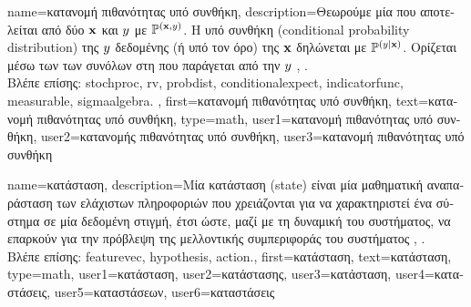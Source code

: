 {name={\foreignlanguage{greek}{κατανομή πιθανότητας υπό συνθήκη}}, 
	description={\foreignlanguage{greek}{Θεωρούμε μία} 
		 \foreignlanguage{greek}{που αποτελείται από δύο}  ${\bf x}$ 
		\foreignlanguage{greek}{και $y$ με}  $\mathbb{P}^{({\bf x},y)}$. 
		\foreignlanguage{greek}{Η}  \foreignlanguage{greek}{υπό συνθήκη} (conditional probability distribution) 
		\foreignlanguage{greek}{της $y$ δεδομένης (ή υπό τον όρο) της ${\bf x}$ δηλώνεται με $\mathbb{P}^{(y|{\bf x})}$. 
		Ορίζεται μέσω των}  \foreignlanguage{greek}{των}  
    		 \foreignlanguage{greek}{συνόλων στη}  
		\foreignlanguage{greek}{που παράγεται από την}  $y$ 
		\cite[\foreignlanguage{greek}{Ενότητα} 34]{BillingsleyProbMeasure}, \cite{KallenbergBook}. 
		\\
		\foreignlanguage{greek}{Βλέπε επίσης:} \gls{stochproc}, \gls{rv}, \gls{probdist}, \gls{conditionalexpect}, 
		\gls{indicatorfunc}, \gls{measurable}, \gls{sigmaalgebra}. },
  	first={\foreignlanguage{greek}{κατανομή πιθανότητας υπό συνθήκη}}, 
  	text={\foreignlanguage{greek}{κατανομή πιθανότητας υπό συνθήκη}},
	type=math,
	user1={\foreignlanguage{greek}{κατανομή πιθανότητας υπό συνθήκη}}, %
  	user2={\foreignlanguage{greek}{κατανομής πιθανότητας υπό συνθήκη}}, %
	user3={\foreignlanguage{greek}{κατανομή πιθανότητας υπό συνθήκη}} %
}

{name={\foreignlanguage{greek}{κατάσταση}},
	description={\foreignlanguage{greek}{Μία κατάσταση} (state) 
		\foreignlanguage{greek}{είναι μία μαθηματική αναπαράσταση των ελάχιστων πληροφοριών  
		που χρειάζονται για να χαρακτηριστεί ένα σύστημα σε μία δεδομένη στιγμή, έτσι ώστε, 
		μαζί με τη δυναμική του συστήματος, να επαρκούν για την πρόβλεψη 
		της μελλοντικής συμπεριφοράς του συστήματος} \cite{SuttonEd2}, \cite{BertsekasDynOptII}. 	
		\\
		\foreignlanguage{greek}{Βλέπε επίσης:} \gls{featurevec}, \gls{hypothesis}, \gls{action}.},
	first={\foreignlanguage{greek}{κατάσταση}},
	text={\foreignlanguage{greek}{κατάσταση}},
	type=math,
	user1={\foreignlanguage{greek}{κατάσταση}}, %
  	user2={\foreignlanguage{greek}{κατάστασης}}, %
	user3={\foreignlanguage{greek}{κατάσταση}}, %
	user4={\foreignlanguage{greek}{καταστάσεις}}, %
  	user5={\foreignlanguage{greek}{καταστάσεων}}, %
	user6={\foreignlanguage{greek}{καταστάσεις}} %
}

